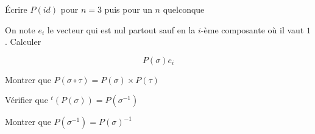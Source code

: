 \documentclass{article}
\begin{document}
\begin{compactenum}[(i)]
\item Écrire $P(id)$ pour $n = 3$ puis pour un $n$ quelconque 
\item On note $e_i$ le vecteur qui est nul partout sauf en 
    la $i$-ème composante où il vaut $1$. Calculer 

    \begin{equation*}
        P(\sigma) e_i 
    \end{equation*}
\item Montrer que $P( \sigma \circ \tau) = P(\sigma) \times P(\tau)$
\item Vérifier que ${}^t \left( P(\sigma) \right) = P\left(\sigma^{-1}\right)$
\item Montrer que $P(\sigma^{-1}) = P(\sigma)^{-1}$
\end{compactenum}
\end{document}
